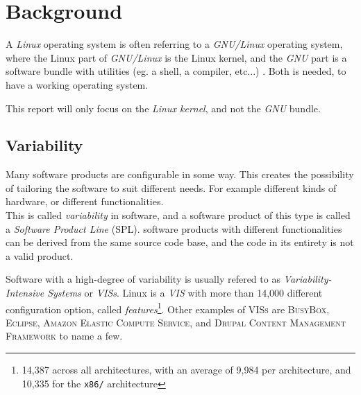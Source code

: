 \documentclass[a4paper,11pt]{report}
\newcommand{\f}{\footnote{\fn}}
\begin{document}

\newpage
        \chapter{Background}

A \emph{Linux} operating system is often referring to a \emph{GNU/Linux} 
operating system, where the Linux part of \emph{GNU/Linux} is the Linux kernel, 
and the \emph{GNU} part is a software bundle with utilities (eg. a shell, a 
compiler, etc...) \cite{gnupack}. Both is 
needed, to have a working operating system. 

This report will only focus on the \emph{Linux kernel}, and not the \emph{GNU} 
bundle.


        \section{Variability}
Many software products are configurable in some way. This creates the 
possibility of tailoring the software to suit different needs. For example 
different kinds of hardware, or different functionalities. 
\\

This is called \emph{variability} in software, and a software product of 
this type is called a \emph{Software Product Line} (SPL). software products 
with different functionalities can be derived from the same source code base, 
and the code in its entirety is not a valid product\cite[p. 1]{IntDatSPL}.
\\

        \def \fn {14,387 across all architectures, with an average of 9,984 per 
        architecture, and 10,335 for the \texttt{x86/} architecture}

Software with a high-degree of variability is usually refered to as 
\emph{Variability-Intensive Systems} or \emph{VISs}. Linux is a \emph{VIS} with 
more than 14,000 different configuration option, called \emph{features}\f.
Other examples of \textsc{VISs} are \textsc{BusyBox}, \textsc{Eclipse}, 
\textsc{Amazon Elastic Compute Service}, and \textsc{Drupal Content Management 
Framework}\cite[p. 1]{VarTesDrupal} to name a few.
\\
\end{document}
